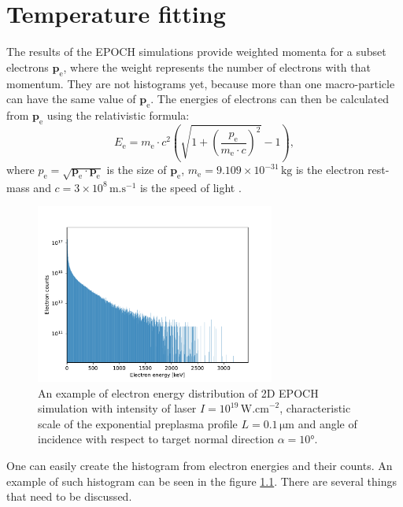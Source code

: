 \chapter{Temperature fitting}
\label{ch:temp-fitting-theory}
The results of the EPOCH simulations provide weighted momenta for a subset electrons $\bm{p}_\mathrm{e}$, where the weight represents the number of electrons with that momentum. They are not histograms yet, because more than one macro-particle can have the same value of $\bm{p}_\mathrm{e}$. The energies of electrons can then be calculated from $\bm{p_\mathrm{e}}$ using the relativistic formula:
\begin{equation}
	\label{eq:rel-energy}
	E_\mathrm{e} = m_\mathrm{e}\cdot c^2\left(\sqrt{1+\left(\frac{p_\mathrm{e}}{m_\mathrm{e}\cdot c}\right)^2} -1\right)\mathrm{,}
\end{equation}
where $p_\mathrm{e}=\sqrt{\bm{p}_\mathrm{e}\cdot\bm{p}_\mathrm{e}}$ is the size of $\bm{p}_\mathrm{e}$, $m_\mathrm{e} =  9.109 \times 10^{-31} \, \mathrm{kg}$ is the electron rest-mass and $c=3\times 10^{8} \, \mathrm{m . s}^{-1}$ is the speed of light \cite{mohr2016}.

\begin{figure}[h]
	\centering
	\includegraphics[width=0.7\textwidth]{figures/example-histogram}
	\caption{An example of electron energy distribution of 2D EPOCH simulation with intensity of laser $I=10^{19}\,\mathrm{W.cm}^{-2}$, characteristic scale of the exponential preplasma profile $L=0.1\,\mathrm{\mu m}$ and angle of incidence with respect to target normal direction $\alpha = 10$°.}
	\label{fig:example-histogram}
\end{figure}
One can easily create the histogram from electron energies and their counts. An example of such histogram can be seen in the figure \ref{fig:example-histogram}. There are several things that need to be discussed.


